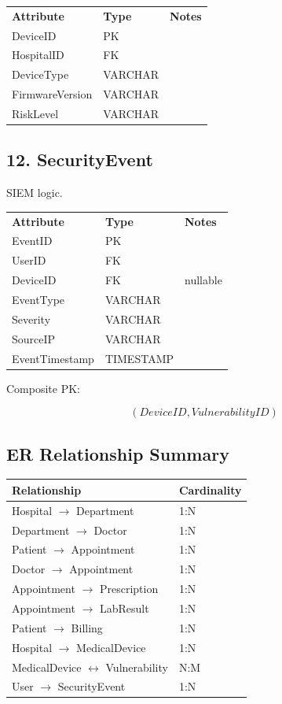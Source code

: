 \begin{tabular}{lll}
\textbf{Attribute} & \textbf{Type} & \textbf{Notes} \\
DeviceID & PK &  \\
HospitalID & FK &  \\
DeviceType & VARCHAR &  \\
FirmwareVersion & VARCHAR &  \\
RiskLevel & VARCHAR &  \\
\end{tabular}

\subsection*{12. SecurityEvent}

SIEM logic.

\begin{tabular}{lll}
\textbf{Attribute} & \textbf{Type} & \textbf{Notes} \\
EventID & PK &  \\
UserID & FK &  \\
DeviceID & FK & nullable \\
EventType & VARCHAR &  \\
Severity & VARCHAR &  \\
SourceIP & VARCHAR &  \\
EventTimestamp & TIMESTAMP &  \\
\end{tabular}


Composite PK:

\[(DeviceID, VulnerabilityID)\]

\subsection*{ER Relationship Summary}

\begin{tabular}{ll}
\textbf{Relationship} & \textbf{Cardinality} \\
\hline
Hospital $\rightarrow$ Department & 1:N \\
Department $\rightarrow$ Doctor & 1:N \\
Patient $\rightarrow$ Appointment & 1:N \\
Doctor $\rightarrow$ Appointment & 1:N \\
Appointment $\rightarrow$ Prescription & 1:N \\
Appointment $\rightarrow$ LabResult & 1:N \\
Patient $\rightarrow$ Billing & 1:N \\
Hospital $\rightarrow$ MedicalDevice & 1:N \\
MedicalDevice $\leftrightarrow$ Vulnerability & N:M \\
User $\rightarrow$ SecurityEvent & 1:N \\
\end{tabular}

